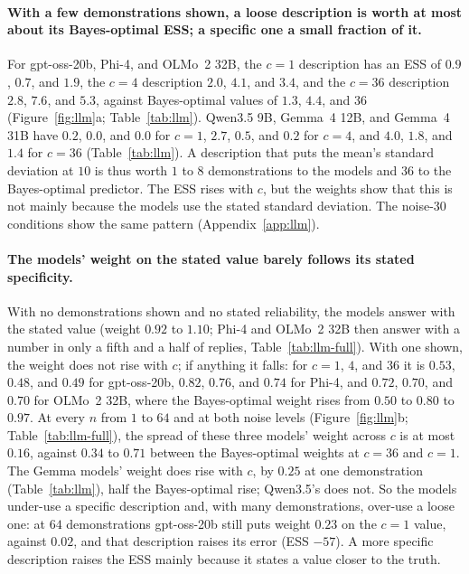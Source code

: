 \documentclass{article}
\begin{document}
\paragraph{With a few demonstrations shown, a loose description is worth at most about its Bayes-optimal ESS; a specific one a small fraction of it.} For gpt-oss-20b, Phi-4, and OLMo~2 32B, the $c = 1$ description has an ESS of $0.9$, $0.7$, and $1.9$, the $c = 4$ description $2.0$, $4.1$, and $3.4$, and the $c = 36$ description $2.8$, $7.6$, and $5.3$, against Bayes-optimal values of $1.3$, $4.4$, and $36$ (Figure~\ref{fig:llm}a; Table~\ref{tab:llm}). Qwen3.5 9B, Gemma~4 12B, and Gemma~4 31B have $0.2$, $0.0$, and $0.0$ for $c = 1$, $2.7$, $0.5$, and $0.2$ for $c = 4$, and $4.0$, $1.8$, and $1.4$ for $c = 36$ (Table~\ref{tab:llm}). A description that puts the mean's standard deviation at $10$ is thus worth $1$ to $8$ demonstrations to the models and $36$ to the Bayes-optimal predictor. The ESS rises with $c$, but the weights show that this is not mainly because the models use the stated standard deviation. The noise-$30$ conditions show the same pattern (Appendix~\ref{app:llm}).

\paragraph{The models' weight on the stated value barely follows its stated specificity.} With no demonstrations shown and no stated reliability, the models answer with the stated value (weight $0.92$ to $1.10$; Phi-4 and OLMo~2 32B then answer with a number in only a fifth and a half of replies, Table~\ref{tab:llm-full}). With one shown, the weight does not rise with $c$; if anything it falls: for $c = 1$, $4$, and $36$ it is $0.53$, $0.48$, and $0.49$ for gpt-oss-20b, $0.82$, $0.76$, and $0.74$ for Phi-4, and $0.72$, $0.70$, and $0.70$ for OLMo~2 32B, where the Bayes-optimal weight rises from $0.50$ to $0.80$ to $0.97$. At every $n$ from $1$ to $64$ and at both noise levels (Figure~\ref{fig:llm}b; Table~\ref{tab:llm-full}), the spread of these three models' weight across $c$ is at most $0.16$, against $0.34$ to $0.71$ between the Bayes-optimal weights at $c = 36$ and $c = 1$. The Gemma models' weight does rise with $c$, by $0.25$ at one demonstration (Table~\ref{tab:llm}), half the Bayes-optimal rise; Qwen3.5's does not. So the models under-use a specific description and, with many demonstrations, over-use a loose one: at $64$ demonstrations gpt-oss-20b still puts weight $0.23$ on the $c = 1$ value, against $0.02$, and that description raises its error (ESS $-57$). A more specific description raises the ESS mainly because it states a value closer to the truth.
\end{document}
